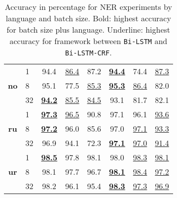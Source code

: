 \begin{table}[h!]
\begin{tabular}{c l c c c|c c c}
        \cmidrule(lr){1-8}
        \multirow{3}{*}{\bfseries no}
        &  1 &
        94.4 & \underline{86.4} & 87.2 &
        \underline{\textbf{94.4}} & 74.4 & \underline{87.3} \\
        &  8 &
        95.1 & 77.5 & \underline{85.3} &
        \underline{\textbf{95.3}} & \underline{86.4} & 82.0 \\
        & 32 &
        \underline{\textbf{94.2}} & \underline{85.5} & \underline{84.5} &
        93.1 & 81.7 & 82.1 \\

        \cmidrule(lr){1-8}
        \multirow{3}{*}{\bfseries ru}
        &  1 &
        \underline{\textbf{97.3}} & \underline{96.5} & 90.8 &
        97.1 & 96.1 & \underline{93.6} \\
        &  8 &
        \underline{\textbf{97.2}} & 96.0 & 85.6 &
        97.0 & \underline{97.1} & \underline{93.3} \\
        & 32 &
        96.9 & 94.1 & 72.3 &
        \underline{\textbf{97.1}} & \underline{97.0} & \underline{91.4} \\

        \cmidrule(lr){1-8}
        \multirow{3}{*}{\bfseries ur}
        &  1 &
        \underline{\textbf{98.5}} & 97.8 & 98.1 &
        98.0 & \underline{98.3} & \underline{98.1} \\
        &  8 &
        98.1 & 97.7 & 96.7 &
        \underline{\textbf{98.1}} & \underline{98.4} & \underline{97.2} \\
        & 32 &
        98.2 & 96.1 & 95.4 &
        \underline{\textbf{98.3}} & \underline{97.3} & \underline{96.9} \\
        \bottomrule
    \end{tabular}
    \caption{Accuracy in percentage for NER experiments by language and batch
        size. Bold: highest accuracy for batch size plus language. Underline:
        highest accuracy for framework between \texttt{Bi-LSTM} and
        \texttt{Bi-LSTM-CRF}.
    }\label{table:acc-total-ner}
\end{table}



\pagebreak
